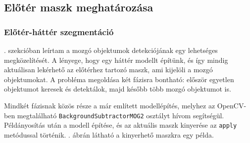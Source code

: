     \subsection{Előtér maszk meghatározása}


\subsubsection{Előtér-háttér szegmentáció}

. szekcióban leírtam a mozgó objektumok detekciójának egy lehetséges megközelítését. A lényege, hogy egy háttér modellt építünk, és így mindig aktuálisan lekérhető az előtérhez tartozó maszk, ami kijelöli a mozgó objektumokat. A probléma megoldása két fázisra bontható: először egyetlen objektumot keresek és detektálok, majd később több mozgó objektumot is.

Mindkét fázisnak közös része a már említett modellépítés, melyhez az OpenCV-ben megtalálható \texttt{BackgroundSubtractorMOG2} osztályt \cite{opencv-mog} hívom segítségül. Példányosítás után a modell építése, és az aktuális maszk kinyerése az \texttt{apply} metódussal történik. . ábrán látható a kinyerhető maszkra egy példa.


